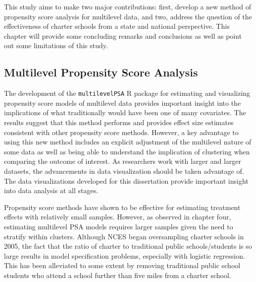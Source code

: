 \documentclass[letterpaper,12p,twoside]{article} %
\begin{document}
This study aims to make two major contributions: first, develop a new method of propensity score analysis for multilevel data, and two, address the question of the effectiveness of charter schools from a state and national perspective. This chapter will provide some concluding remarks and conclusions as well as point out some limitations of this study.

\subsection{Multilevel Propensity Score Analysis}

The development of the \texttt{multilevelPSA} R package for estimating and visualizing propensity score models of multilevel data provides important insight into the implications of what traditionally would have been one of many covariates. The results suggest that this method performs and provides effect size estimates consistent with other propensity score methods. However, a key advantage to using this new method includes an explicit adjustment of the multilevel nature of some data as well as being able to understand the implication of clustering when comparing the outcome of interest. As researchers work with larger and larger datasets, the advancements in data visualization should be taken advantage of. The data visualizations developed for this dissertation provide important insight into data analysis at all stages.

Propensity score methods have shown to be effective for estimating treatment effects with relatively small samples. However, as observed in chapter four, estimating multilevel PSA models requires larger samples given the need to stratify within clusters. Although NCES began oversampling charter schools in 2005, the fact that the ratio of charter to traditional public schools/students is so large results in model specification problems, especially with logistic regression. This has been alleviated to some extent by removing traditional public school students who attend a school further than five miles from a charter school. 
\end{document}
